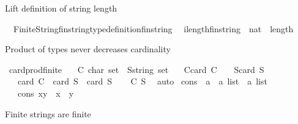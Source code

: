 \begin{isabellebody}
\endisatagproof
{\isafoldproof}%
%
\isadelimproof
%
\endisadelimproof
%
\begin{isamarkuptext}%
Lift definition of string length%
\end{isamarkuptext}\isamarkuptrue%
\isamarkupfalse%
\ \ Finite{\isacharunderscore}String{\isachardot}fin{\isacharunderscore}string{\isachardot}type{\isacharunderscore}definition{\isacharunderscore}fin{\isacharunderscore}string\ \isanewline
{}\isamarkupfalse%
\ ilength{\isacharcolon}{\isacharcolon}{\isachardoublequoteopen}fin{\isacharunderscore}string\ {\isasymRightarrow}\ nat{\isachardoublequoteclose}\ \ length%
\isadelimproof
\ %
\endisadelimproof
%
\isatagproof
{}\isamarkupfalse%
%
\endisatagproof
{\isafoldproof}%
%
\isadelimproof
%
\endisadelimproof
%
\begin{isamarkuptext}%
Product of types never decreases cardinality%
\end{isamarkuptext}\isamarkuptrue%
\isamarkupfalse%
\ card{\isacharunderscore}prod{\isacharunderscore}finite{\isacharcolon}\isanewline
\ \ \ C{\isacharcolon}{\isacharcolon}\ {\isachardoublequoteopen}char\ set{\isachardoublequoteclose}\ \ S{\isacharcolon}{\isacharcolon}{\isachardoublequoteopen}string\ set{\isachardoublequoteclose}\isanewline
\ \ \ C{\isacharcolon}{\isachardoublequoteopen}card\ C\ {\isasymge}\ {}{\isachardoublequoteclose}\ \ S{\isacharcolon}{\isachardoublequoteopen}card\ S\ {\isasymge}\ {}{\isachardoublequoteclose}\isanewline
\ \ \ {\isachardoublequoteopen}card\ C\ {\isacharasterisk}\ card\ S\ {\isasymge}\ card\ S{\isachardoublequoteclose}\isanewline
%
\isadelimproof
\ \ %
\endisadelimproof
%
\isatagproof
{}\isamarkupfalse%
\ C\ S\ \isamarkupfalse%
\ auto%
\endisatagproof
{\isafoldproof}%
%
\isadelimproof
\isanewline
%
\endisadelimproof
\isanewline
{}\isamarkupfalse%
\ cons\ {\isacharcolon}{\isacharcolon}\ {\isachardoublequoteopen}{\isacharparenleft}{\isacharprime}a\ {\isacharasterisk}\ {\isacharprime}a\ list{\isacharparenright}\ {\isasymRightarrow}\ {\isacharprime}a\ list{\isachardoublequoteclose}\ \isanewline
\ \ \ {\isachardoublequoteopen}cons\ {\isacharparenleft}x{\isacharcomma}y{\isacharparenright}\ {\isacharequal}\ x\ {\isacharhash}\ y{\isachardoublequoteclose}%
\begin{isamarkuptext}%
Finite strings are finite%

\end{isamarkuptext}
\end{isabellebody}
